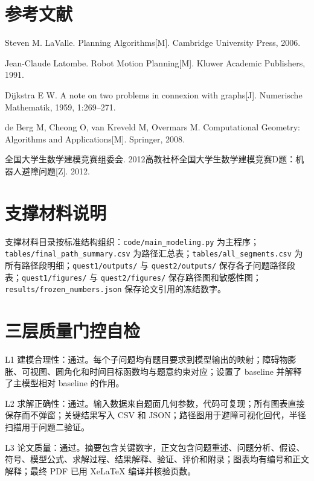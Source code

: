 \documentclass[UTF8,a4paper,12pt]{ctexart}
\begin{document}
\section*{参考文献}
\begin{enumerate}[label={[\arabic*]}]
    \item Steven M. LaValle. Planning Algorithms[M]. Cambridge University Press, 2006.
    \item Jean-Claude Latombe. Robot Motion Planning[M]. Kluwer Academic Publishers, 1991.
    \item Dijkstra E W. A note on two problems in connexion with graphs[J]. Numerische Mathematik, 1959, 1:269--271.
    \item de Berg M, Cheong O, van Kreveld M, Overmars M. Computational Geometry: Algorithms and Applications[M]. Springer, 2008.
    \item 全国大学生数学建模竞赛组委会. 2012高教社杯全国大学生数学建模竞赛D题：机器人避障问题[Z]. 2012.
\end{enumerate}

\appendix
\section{支撑材料说明}
支撑材料目录按标准结构组织：\texttt{code/main\_modeling.py} 为主程序；\texttt{tables/final\_path\_summary.csv} 为路径汇总表；\texttt{tables/all\_segments.csv} 为所有路径段明细；\texttt{quest1/outputs/} 与 \texttt{quest2/outputs/} 保存各子问题路径段表；\texttt{quest1/figures/} 与 \texttt{quest2/figures/} 保存路径图和敏感性图；\texttt{results/frozen\_numbers.json} 保存论文引用的冻结数字。

\section{三层质量门控自检}
L1 建模合理性：通过。每个子问题均有题目要求到模型输出的映射；障碍物膨胀、可视图、圆角化和时间目标函数均与题意约束对应；设置了 baseline 并解释了主模型相对 baseline 的作用。

L2 求解正确性：通过。输入数据来自题面几何参数，代码可复现；所有图表直接保存而不弹窗；关键结果写入 CSV 和 JSON；路径图用于避障可视化回代，半径扫描用于问题二验证。

L3 论文质量：通过。摘要包含关键数字，正文包含问题重述、问题分析、假设、符号、模型公式、求解过程、结果解释、验证、评价和附录；图表均有编号和正文解释；最终 PDF 已用 XeLaTeX 编译并核验页数。
\end{document}
